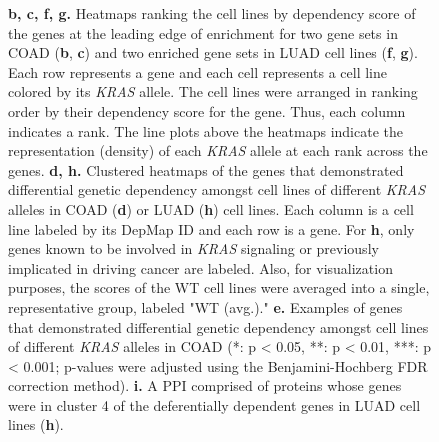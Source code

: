 \documentclass[english, 10pt, letterpaper]{article}
\newcommand{\KRAS}{\emph{KRAS}}
\begin{document}
\begin{figure}[p]
{    \textbf{b, c, f, g.} Heatmaps ranking the cell lines by dependency score of the genes at the leading edge of enrichment for two gene sets in COAD (\textbf{b}, \textbf{c}) and two enriched gene sets in LUAD cell lines (\textbf{f}, \textbf{g}). Each row represents a gene and each cell represents a cell line colored by its \KRAS{} allele. The cell lines were arranged in ranking order by their dependency score for the gene. Thus, each column indicates a rank. The line plots above the heatmaps indicate the representation (density) of each \KRAS{} allele at each rank across the genes.
    \textbf{d, h.} Clustered heatmaps of the genes that demonstrated differential genetic dependency amongst cell lines of different \KRAS{} alleles in COAD (\textbf{d}) or LUAD (\textbf{h}) cell lines. Each column is a cell line labeled by its DepMap ID and each row is a gene. For \textbf{h}, only genes known to be involved in \KRAS{} signaling or previously implicated in driving cancer are labeled. Also, for visualization purposes, the scores of the WT cell lines were averaged into a single, representative group, labeled "WT (avg.)."
    \textbf{e.} Examples of genes that demonstrated differential genetic dependency amongst cell lines of different \KRAS{} alleles in COAD (*: p < 0.05, **: p < 0.01, ***: p < 0.001; p-values were adjusted using the Benjamini-Hochberg FDR correction method).
    \textbf{i.} A PPI comprised of proteins whose genes were in cluster 4 of the deferentially dependent genes in LUAD cell lines (\textbf{h}).
}
\label{fig:coadluad-dependency-main}
\end{figure}
\end{document}
